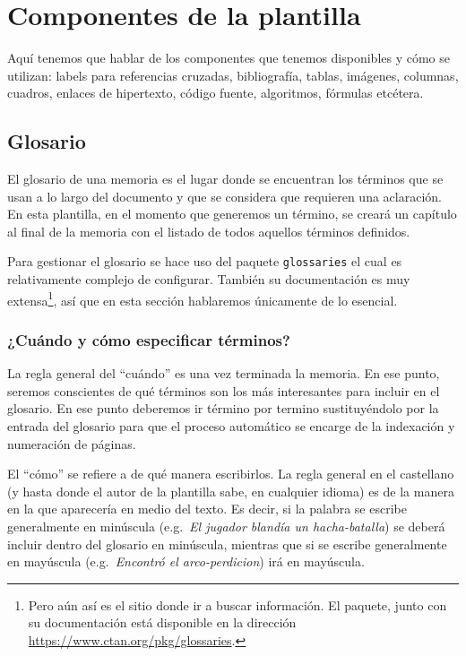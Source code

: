 \chapter{Componentes de la plantilla}
\label{ch:soa}

Aquí tenemos que hablar de los componentes que tenemos disponibles y cómo se utilizan: labels para referencias cruzadas, bibliografía, tablas, imágenes, columnas, cuadros, enlaces de hipertexto, código fuente, algoritmos, fórmulas etcétera.

\section{Glosario}
\label{s:glosario}

El glosario de una memoria es el lugar donde se encuentran los términos que se usan a lo largo del documento y que se considera que requieren una aclaración. En esta plantilla, en el momento que generemos un término, se creará un capítulo al final de la memoria con el listado de todos aquellos términos definidos.

Para gestionar el glosario se hace uso del paquete \texttt{glossaries} el cual es relativamente complejo de configurar. También su documentación es muy extensa\footnote{Pero aún así es el sitio donde ir a buscar información. El paquete, junto con su documentación está disponible en la dirección \href{https://www.ctan.org/pkg/glossaries}{https://www.ctan.org/pkg/glossaries}.}, así que en esta sección hablaremos únicamente de lo esencial.

\subsection{¿Cuándo y cómo especificar términos?}

La regla general del \enquote{cuándo} es una vez terminada la memoria. En ese punto, seremos conscientes de qué términos son los más interesantes para incluir en el glosario. En ese punto deberemos ir término por termino sustituyéndolo por la entrada del glosario para que el proceso automático se encarge de la indexación y numeración de páginas.

El \enquote{cómo} se refiere a de qué manera escribirlos. La regla general en el castellano (y hasta donde el autor de la plantilla sabe, en cualquier idioma) es de la manera en la que aparecería en medio del texto. Es decir, si la palabra se escribe generalmente en minúscula (e.g.~\textit{El jugador blandía un \gls{hacha-batalla}}) se deberá incluir dentro del glosario en minúscula, mientras que si se escribe generalmente en mayúscula (e.g.~\textit{Encontró el \gls{arco-perdicion}}) irá en mayúscula.

